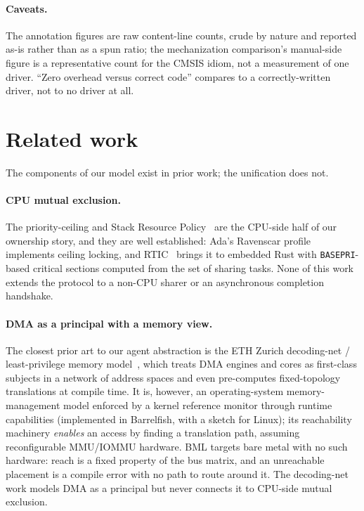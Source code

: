\documentclass[10pt,twocolumn]{article}
\begin{document}
\paragraph{Caveats.} The annotation figures are raw content-line counts, crude by
nature and reported as-is rather than as a spun ratio; the mechanization
comparison's manual-side figure is a representative count for the CMSIS idiom, not
a measurement of one driver. ``Zero overhead versus correct code'' compares to a
correctly-written driver, not to no driver at all.

\section{Related work}
\label{sec:related}

The components of our model exist in prior work; the unification does not.

\paragraph{CPU mutual exclusion.} The priority-ceiling and Stack Resource
Policy~\cite{baker1991} are the CPU-side half of our ownership story, and they
are well established: Ada's Ravenscar profile~\cite{ravenscar} implements ceiling
locking, and RTIC~\cite{rtic} brings it to embedded Rust with
\texttt{BASEPRI}-based critical sections computed from the set of sharing tasks.
None of this work extends the protocol to a non-CPU sharer or an asynchronous
completion handshake.

\paragraph{DMA as a principal with a memory view.} The closest prior art to our
agent abstraction is the ETH Zurich decoding-net / least-privilege memory
model~\cite{achermann2019}, which treats DMA engines and cores as first-class
subjects in a network of address spaces and even pre-computes fixed-topology
translations at compile time. It is, however, an operating-system
memory-management model enforced by a kernel reference monitor through runtime
capabilities (implemented in Barrelfish, with a sketch for Linux); its reachability
machinery \emph{enables} an access by finding a translation path, assuming
reconfigurable MMU/IOMMU hardware. BML targets bare metal with no such hardware:
reach is a fixed property of the bus matrix, and an unreachable placement is a
compile error with no path to route around it. The decoding-net work models DMA
as a principal but never connects it to CPU-side mutual exclusion.
\end{document}
